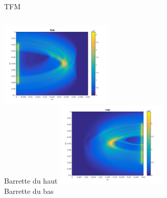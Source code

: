 \documentclass[10pt,xcolor=x11names,compress, notes=show]{beamer}%
\begin{document}
\begin{frame}
\end{frame}

\begin{frame}{TFM}
	\centering
	 \begin{columns}
	 	\centering
	 	\includegraphics[height=4cm]{img/image_tfm.png}\\
	 	Barrette du haut
	 	\centering
	 	\includegraphics[height=4cm]{img/image_tfm2.png}\\
	 	Barrette du bas
	 \end{columns}
	 
\end{frame}
\end{document}
